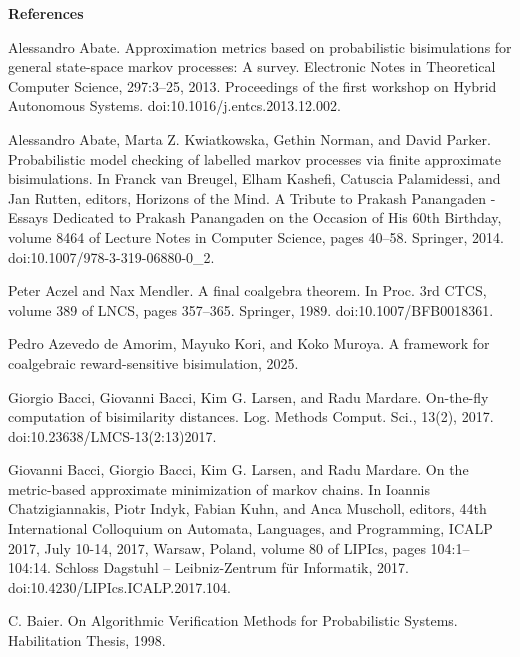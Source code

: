 
 
\par\medskip\noindent\textbf{References}\par
  
\par\noindent  [1]  Alessandro Abate.  Approximation metrics based on probabilistic bisimulations for general state-space markov processes: A survey.  Electronic Notes in Theoretical Computer Science, 297:3–25, 2013.  Proceedings of the first workshop on Hybrid Autonomous Systems.  doi:10.1016/j.entcs.2013.12.002.  
 
\par\noindent  [2]  Alessandro Abate, Marta Z. Kwiatkowska, Gethin Norman, and David Parker.  Probabilistic model checking of labelled markov processes via finite approximate bisimulations.  In Franck van Breugel, Elham Kashefi, Catuscia Palamidessi, and Jan Rutten, editors, Horizons of the Mind. A Tribute to Prakash Panangaden - Essays Dedicated to Prakash Panangaden on the Occasion of His 60th Birthday, volume 8464 of Lecture Notes in Computer Science, pages 40–58. Springer, 2014.  doi:10.1007/978-3-319-06880-0\_2.  
 
\par\noindent  [3]  Peter Aczel and Nax Mendler.  A final coalgebra theorem.  In Proc. 3rd CTCS, volume 389 of LNCS, pages 357–365. Springer, 1989.  doi:10.1007/BFB0018361.  
 
\par\noindent  [4]  Pedro Azevedo de Amorim, Mayuko Kori, and Koko Muroya.  A framework for coalgebraic reward-sensitive bisimulation, 2025.  
 
\par\noindent  [5]  Giorgio Bacci, Giovanni Bacci, Kim G. Larsen, and Radu Mardare.  On-the-fly computation of bisimilarity distances.  Log. Methods Comput. Sci., 13(2), 2017.  doi:10.23638/LMCS-13(2:13)2017.  
 
\par\noindent  [6]  Giovanni Bacci, Giorgio Bacci, Kim G. Larsen, and Radu Mardare.  On the metric-based approximate minimization of markov chains.  In Ioannis Chatzigiannakis, Piotr Indyk, Fabian Kuhn, and Anca Muscholl, editors, 44th International Colloquium on Automata, Languages, and Programming, ICALP 2017, July 10-14, 2017, Warsaw, Poland, volume 80 of LIPIcs, pages 104:1–104:14. Schloss Dagstuhl – Leibniz-Zentrum für Informatik, 2017.  doi:10.4230/LIPIcs.ICALP.2017.104.  
 
\par\noindent  [7]  C. Baier.  On Algorithmic Verification Methods for Probabilistic Systems.  Habilitation Thesis, 1998.  
 
